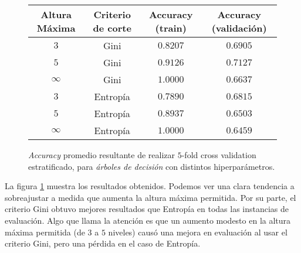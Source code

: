 \vspace{0.5em}
\begin{figure}[!htbp]
    \begin{center}
        \begin{tabular}{ |c|c|c|c| } 
         \hline
        Altura Máxima   & Criterio de corte & Accuracy (train)  & Accuracy (validación) \\
        \hline
        $3$             & Gini              &  $0.8207$         & $0.6905$  \\ 
        $5$             & Gini              &  $0.9126$         & $0.7127$  \\
        $\infty$        & Gini              &  $1.0000$         & $0.6637$  \\ 
        $3$             & Entropía          &  $0.7890$         & $0.6815$  \\
        $5$             & Entropía          &  $0.8937$         & $0.6503$  \\ 
        $\infty$        & Entropía          &  $1.0000$         & $0.6459$  \\ 
        \hline
        \end{tabular}
    \end{center}
    \caption{\textit{Accuracy} promedio resultante de realizar $5$-fold cross validation estratificado, para \textit{árboles de decisión} con distintos hiperparámetros.} \label{grid_search}
\end{figure}

La figura \ref{grid_search} muestra los resultados obtenidos. Podemos ver una clara tendencia a sobreajustar a medida que aumenta la altura máxima permitida. Por su parte, el criterio Gini obtuvo mejores resultados que Entropía en todas las instancias de evaluación. Algo que llama la atención es que un aumento modesto en la altura máxima permitida (de $3$ a $5$ niveles) causó una mejora en evaluación al usar el criterio Gini, pero una pérdida en el caso de Entropía.
